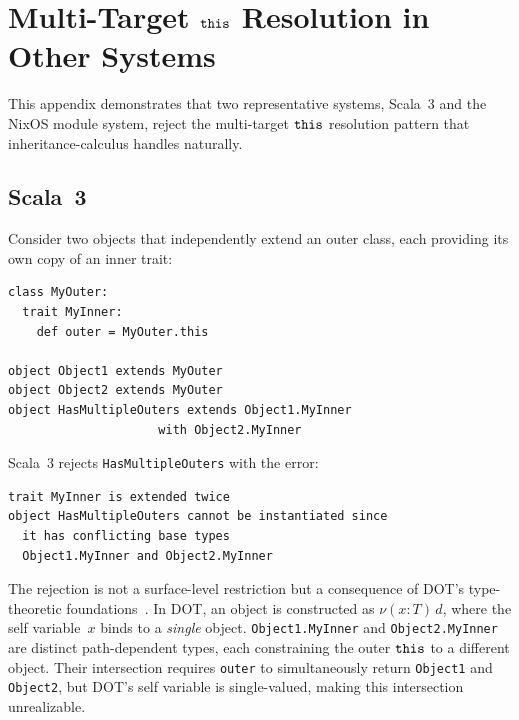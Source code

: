 \section{Multi-Target \texorpdfstring{$\mathtt{this}$}{this} Resolution in Other Systems}
\label{app:scala-multi-target}

This appendix demonstrates that two representative systems, Scala~3
and the NixOS module system, reject the multi-target $\mathtt{this}$ resolution
pattern that inheritance-calculus handles naturally.

\subsection*{Scala~3}

Consider two objects that independently extend an outer class,
each providing its own copy of an inner trait:

\begin{lstlisting}[style=scala]
class MyOuter:
  trait MyInner:
    def outer = MyOuter.this

object Object1 extends MyOuter
object Object2 extends MyOuter
object HasMultipleOuters extends Object1.MyInner
                     with Object2.MyInner
\end{lstlisting}

\noindent
Scala~3 rejects \texttt{HasMultipleOuters} with the error:

\begin{lstlisting}
trait MyInner is extended twice
object HasMultipleOuters cannot be instantiated since
  it has conflicting base types
  Object1.MyInner and Object2.MyInner
\end{lstlisting}

\noindent
The rejection is not a surface-level restriction but a consequence
of DOT's type-theoretic foundations~\cite{amin2016-dependent-object-types}.
In DOT, an object is constructed as $\nu(x : T)\, d$, where the
self variable~$x$ binds to a \emph{single} object.
\texttt{Object1.MyInner} and \texttt{Object2.MyInner} are distinct
path-dependent types, each constraining the outer $\mathtt{this}$
to a different object.
Their intersection requires \texttt{outer} to simultaneously
return \texttt{Object1} and \texttt{Object2}, but DOT's self
variable is single-valued, making this intersection unrealizable.

